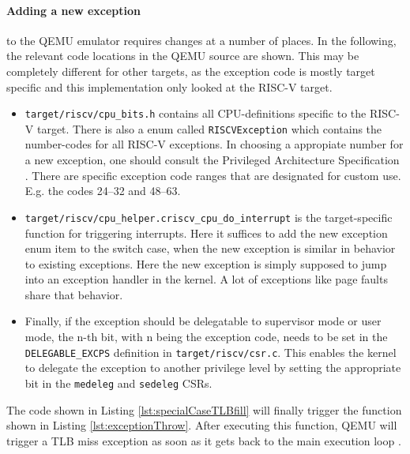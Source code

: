 \paragraph{Adding a new exception}to the QEMU emulator requires changes at a number of places. In the following,
the relevant code locations in the QEMU source \cite{QEMUSource2024} are shown.
This may be completely different for other targets, as the exception code is mostly target specific and
this implementation only looked at the RISC-V target.
\begin{itemize}
    \item \texttt{target/riscv/cpu\_bits.h} contains all CPU-definitions specific to the RISC-V target.
          There is also a enum called \texttt{RISCVException} which contains the number-codes for all RISC-V exceptions.
          In choosing a appropiate number for a new exception, one should consult the Privileged Architecture Specification \cite{RISCVInstructionSet}.
          There are specific exception code ranges that are designated for custom use. E.g. the codes 24--32 and 48--63.
    \item \texttt{target/riscv/cpu\_helper.c\:riscv\_cpu\_do\_interrupt\(\)} is the target-specific function
          for triggering interrupts. Here it suffices to add the new exception enum item to the switch case, when
          the new exception is similar in behavior to existing exceptions.
          Here the new exception is simply supposed to jump into an exception handler in the kernel. A lot of exceptions
          like page faults share that behavior.
    \item Finally, if the exception should be delegatable to supervisor mode or user mode, the n-th bit,
          with n being the exception code, needs to be set in the \texttt{DELEGABLE\_EXCPS} definition in \texttt{target/riscv/csr.c}.
          This enables the kernel to delegate the exception to another privilege level by setting the appropriate
          bit in the \texttt{medeleg} and \texttt{sedeleg} CSRs.
\end{itemize}

The code shown in Listing \ref{lst:specialCaseTLBfill} will finally trigger the function shown in
Listing \ref{lst:exceptionThrow}. After executing this function, QEMU will trigger a TLB miss exception as soon
as it gets back to the main execution loop \cite{QEMUSource2024}.

